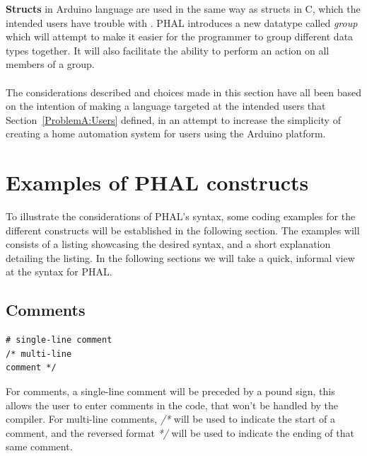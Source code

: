 \textbf{Structs} in Arduino language are used in the same way as structs in C, which the intended users have trouble with \cite{FiveCommonArduinoMistakes}. 
PHAL introduces a new datatype called \textit{group} which will attempt to make it easier for the programmer to group different data types together. 
It will also facilitate the ability to perform an action on all members of a group. 
\\\\
The considerations described and choices made in this section have all been based on the intention of making a language targeted at the intended users that Section~\ref{ProblemA:Users} defined, in an attempt to increase the simplicity of creating a home automation system for users using the Arduino platform.

\section{Examples of PHAL constructs}\label{ExamplesOfPHALConstructs}
To illustrate the considerations of PHAL's syntax, some coding examples for the different constructs will be established in the following section. 
The examples will consists of a listing showcasing the desired syntax, and a short explanation detailing the listing. 
In the following sections we will take a quick, informal view at the syntax for PHAL. 
\subsection{Comments}
\begin{lstlisting}[caption={Example of comments},label={code:comments}] 
# single-line comment
/* multi-line
comment */
\end{lstlisting}
For comments, a single-line comment will be preceded by a pound sign, this allows the user to enter comments in the code, that won't be handled by the compiler.
For multi-line comments, \textit{/*} will be used to indicate the start of a comment, and the reversed format \textit{*/} will be used to indicate the ending of that same comment. 

